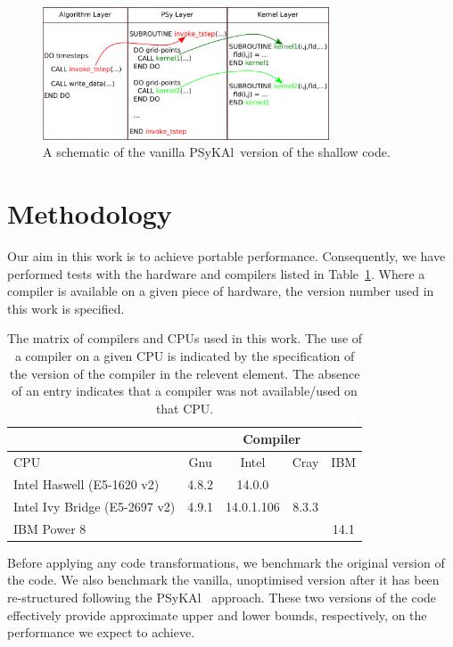 \documentclass{IOS-Book-Article}
\newcommand{\psykal}{{PS}y{KA}l\ }
\begin{document}
\begin{figure}
\centering
\includegraphics[width=85mm]{../psykal_shallow}
\caption{A schematic of the vanilla \psykal version of the shallow code.}
\label{FIG_psykal_shallow_structure}
\end{figure}

\section{Methodology}

Our aim in this work is to achieve portable performance. Consequently,
we have performed tests with the hardware and compilers listed in
Table~\ref{TABLE_compilers}. Where a compiler is available on a given
piece of hardware, the version number used in this work is specified.

\begin{table}[!t]
\renewcommand{\arraystretch}{1.3}
\caption{The matrix of compilers and CPUs used in this work. The use
  of a compiler on a given CPU is indicated by the specification of
  the version of the compiler in the relevent element. The absence of an entry
  indicates that a compiler was not available/used on that CPU.}
\label{TABLE_compilers}
\centering
\begin{tabular}{|l|c|c|c|c|}
\hline
                 & \multicolumn{4}{c|}{Compiler}             \\
\hline
       CPU       & Gnu   & Intel       & Cray    & IBM     \\
\hline
Intel Haswell (E5-1620 v2)   & 4.8.2 & 14.0.0      &         & \\
Intel Ivy Bridge  (E5-2697 v2) & 4.9.1 & 14.0.1.106  & 8.3.3 & \\
IBM Power 8      &       &             &             & 14.1    \\
\hline
\end{tabular}
\end{table}

Before applying any code transformations, we benchmark the original
version of the code. We also benchmark the vanilla, unoptimised
version after it has been re-structured following the \psykal
approach. These two versions of the code effectively provide
approximate upper and lower bounds, respectively, on the performance
we expect to achieve.
\end{document}
